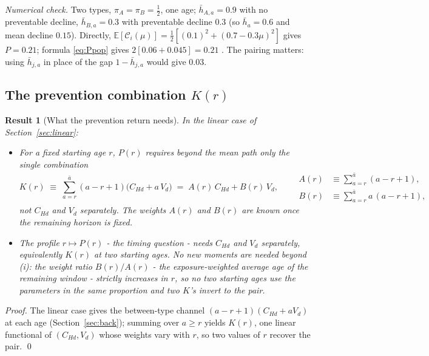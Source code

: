\documentclass[11pt]{article}
\newtheorem{result}{Result}
\theoremstyle{remark}
\newcommand{\E}{\mathbb{E}}
\begin{document}
\emph{Numerical check.} Two types, $\pi_A=\pi_B=\tfrac12$, one age; $\bar h_{A,a}=0.9$ with no preventable decline, $\bar h_{B,a}=0.3$ with preventable decline $0.3$ (so $\bar h_a=0.6$ and mean decline $0.15$).
Directly, $\E[\mathcal{C}_i(\mu)]=\tfrac12[(0.1)^2+(0.7-0.3\mu)^2]$ gives $P=0.21$; formula \eqref{eq:Ppop} gives $2[0.06+0.045]=0.21$ \checkmark.
The pairing matters: using $\bar h_{j,a}$ in place of the gap $1-\bar h_{j,a}$ would give $0.03$.

\subsection*{The prevention combination $K(r)$}

\begin{result}[What the prevention return needs]\label{res:Kr}
In the linear case of Section~\ref{sec:linear}:
\begin{itemize}
\item[(i)] For a \emph{fixed} starting age $r$, $P(r)$ requires beyond the mean path only the single combination
\begin{equation}
K(r)\;\equiv\;\sum_{a=r}^{\bar a}(a-r+1)\bigl(C_{Hd}+a\,V_d\bigr)
\;=\;A(r)\,C_{Hd}+B(r)\,V_d,
\qquad
\begin{aligned}
A(r)&\equiv\textstyle\sum_{a=r}^{\bar a}(a-r+1),\\
B(r)&\equiv\textstyle\sum_{a=r}^{\bar a}a\,(a-r+1),
\end{aligned}
\label{eq:Ks}
\end{equation}
not $C_{Hd}$ and $V_d$ separately. The weights $A(r)$ and $B(r)$ are known once the remaining horizon is fixed.
\item[(ii)] The \emph{profile} $r\mapsto P(r)$ - the timing question - needs $C_{Hd}$ and $V_d$ separately, equivalently $K(r)$ at two starting ages.
No new moments are needed beyond (i): the weight ratio $B(r)/A(r)$ - the exposure-weighted average age of the remaining window - strictly increases in $r$, so no two starting ages use the parameters in the same proportion and two $K$'s invert to the pair.
\end{itemize}
\end{result}

\emph{Proof.} The linear case gives the between-type channel $(a-r+1)(C_{Hd}+aV_d)$ at each age (Section~\ref{sec:back}); summing over $a\ge r$ yields $K(r)$, one linear functional of $(C_{Hd},V_d)$ whose weights vary with $r$, so two values of $r$ recover the pair.
\qed
\end{document}
